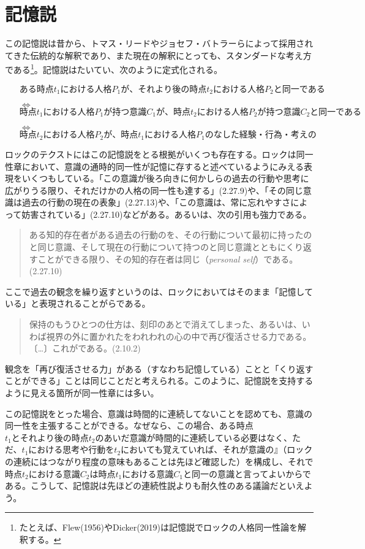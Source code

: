 \documentclass[a4j,oneside]{jsbook}
\begin{document}
\section{
記憶説
}
この記憶説は昔から、トマス・リードやジョセフ・バトラーらによって採用されてきた伝統的な解釈であり、また現在の解釈にとっても、スタンダードな考え方である\footnote{たとえば、Flew(1956)やDicker(2019)は記憶説でロックの人格同一性論を解釈する。}。記憶説はたいてい、次のように定式化される。
\begin{itemize}
\item[]$ある時点t_1における人格P_1が、それより後の時点t_2における人格P_2と同一である$
\item[$\iff$]$時点t_1における人格P_1が持つ意識C_1が、時点t_2における人格P_2が持つ意識C_2と同一である$
\item[$\iff$]$時点t_2における人格P_2が、時点t_1における人格P_1のなした経験・行為・考えの$
\end{itemize}
\par
ロックのテクストにはこの記憶説をとる根拠がいくつも存在する。ロックは同一性章において、意識の通時的同一性が記憶に存すると述べているようにみえる表現をいくつもしている。「この意識が後ろ向きに何かしらの過去の行動や思考に広がりうる限り、それだけかの人格の同一性も達する」(2.27.9)や、「その同じ意識は過去の行動の現在の表象」(2.27.13)や、「この意識は、常に忘れやすさによって妨害されている」(2.27.10)などがある。あるいは、次の引用も強力である。
\begin{quote}
ある知的存在者がある過去の行動のを、その行動について最初に持ったのと同じ意識、そして現在の行動について持つのと同じ意識とともにくり返すことができる限り、その知的存在者は同じ（{\itshape personal self}）である。(2.27.10)
\end{quote}
ここで過去の観念を繰り返すというのは、ロックにおいてはそのまま「記憶している」と表現されることがらである。
\begin{quote}
保持のもうひとつの仕方は、刻印のあとで消えてしまった、あるいは、いわば視界の外に置かれたをわれわれの心の中で再び復活させる力である。〔…〕これがである。(2.10.2)
\end{quote}
観念を「再び復活させる力」がある（すなわち記憶している）ことと「くり返すことができる」ことは同じことだと考えられる。このように、記憶説を支持するように見える箇所が同一性章には多い。
\par
この記憶説をとった場合、意識は時間的に連続してないことを認めても、意識の同一性を主張することができる。なぜなら、この場合、ある時点$t_1とそれより後の時点t_2$のあいだ意識が時間的に連続している必要はなく、ただ、$t_1における思考や行動をt_2$においても覚えていれば、それが意識の』（ロックの連続にはつながり程度の意味もあることは先ほど確認した）を構成し、それで時点$t_2における意識C_2は時点t_1における意識C_1$と同一の意識と言ってよいからである。こうして、記憶説は先ほどの連続性説よりも耐久性のある議論だといえよう。
\end{document}
